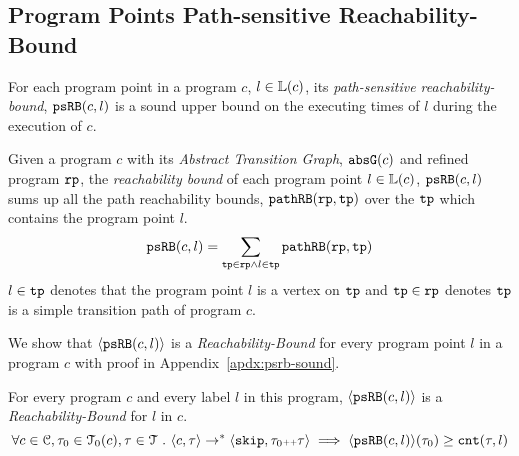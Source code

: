 \subsection{Program Points Path-sensitive Reachability-Bound}
\label{sec:point-psrb}
For each program point in a program $c$, $l \in \mathbb{L}(c)$,
its \emph{path-sensitive reachability-bound}, $\mathtt{psRB}(c, l)$ is a sound upper bound on the executing times of $l$ during the execution of $c$.
%
 \begin{defn}
  \label{def:point_psrb}
  Given a program $c$ with its \emph{Abstract Transition Graph}, $\mathtt{abs}{\mathtt{G}}(c)$ and refined program $\mathtt{rp}$,
  the \emph{reachability bound} of each program point $l \in \mathbb{L}(c)$, $\mathtt{psRB}(c, l)$ 
  sums up all the path reachability bounds, $\mathtt{pathRB}(\mathtt{rp}, \mathtt{tp})$ over the $\mathtt{tp}$ which contains the program point $l$.
  \[ 
    \mathtt{psRB}(c, l) = 
    \sum\limits_{\mathtt{tp} \in \mathtt{rp} \land 
  l \in \mathtt{tp}} 
  \mathtt{pathRB}(\mathtt{rp}, \mathtt{tp})
  \]
  $l \in \mathtt{tp}$ denotes that the program point $l$ is a vertex on $\mathtt{tp}$ 
  and $\mathtt{tp} \in \mathtt{rp}$ denotes $\mathtt{tp}$ is a simple transition path of program $c$.
 \end{defn}
We show that $\langle \mathtt{psRB}(c, l) \rangle$ is a \emph{Reachability-Bound} for every program point $l$ in a program $c$ with proof in Appendix~\ref{apdx:psrb-sound}.
\begin{thm}
    \label{thm:pathsensitive_rb_soundness}
  For every program ${c}$ and every label $l$ in this program,
  $\langle \mathtt{psRB}(c, l) \rangle$ is a \emph{Reachability-Bound} for $l$ in $c$.
  \[
    \forall c \in \mathcal{C}, \mathtt{\tau}_0 \in \mathcal{T}_0(c), \mathtt{\tau} \in \mathcal{T} ~.~ 
    \langle {c}, \mathtt{\tau} \rangle \to^{*} \langle \mathtt{skip}, \mathtt{\tau}_0 {\scriptscriptstyle ++} \mathtt{\tau} \rangle 
    \implies \langle \mathtt{psRB}(c, l) \rangle(\mathtt{\tau}_0) \geq \mathtt{cnt}(\mathtt{\tau}, l) 
    \]
  \end{thm}
